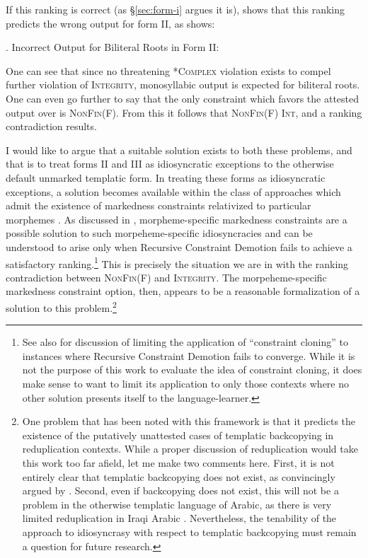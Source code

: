 \documentclass[12pt,twoside,letterpaper]{article}
\begin{document}
If this ranking is correct (as \S{\ref{sec:form-i}} argues it is), \Next shows that this ranking predicts the wrong output for form II, as \Next shows:

\ex. Incorrect Output for Biliteral Roots in Form II:\\\begin{OTtableau}{3}
\end{OTtableau}

One can see that since no threatening *\textsc{Complex} violation exists to compel further violation of \textsc{Integrity}, monosyllabic output is expected for biliteral roots. One can even go further to say that the only constraint which favors the attested output {\em {}} over {\em {}} is \textsc{NonFin}(F). From this it follows that \textsc{NonFin}(F) \OTdom \textsc{Int}, and a ranking contradiction results.

I would like to argue that a suitable solution exists to both these problems, and that is to treat forms II and III as idiosyncratic exceptions to the otherwise default unmarked templatic form. In treating these forms as idiosyncratic exceptions, a solution becomes available within the class of approaches which admit the existence of markedness constraints relativized to particular morphemes \citep{pater00,flack07,paterToAppear}. As discussed in \cite{paterToAppear}, morpheme-specific markedness constraints are a possible solution to such morpeheme-specific idiosyncracies and can be understood to arise only when Recursive Constraint Demotion \citep{tesar00} fails to achieve a satisfactory ranking.\footnote{See also \cite{becker09} for discussion of limiting the application of ``constraint cloning'' to instances where Recursive Constraint Demotion fails to converge. While it is not the purpose of this work to evaluate the idea of constraint cloning, it does make sense to want to limit its application to only those contexts where no other solution presents itself to the language-learner.} This is precisely the situation we are in with the ranking contradiction between \textsc{NonFin}(F) and \textsc{Integrity}. The morpeheme-specific markedness constraint option, then, appears to be a reasonable formalization of a solution to this problem.\footnote{One problem that has been noted with this framework is that it predicts the existence of the putatively unattested cases of templatic backcopying in reduplication contexts. While a proper discussion of reduplication would take this work too far afield, let me make two comments here. First, it is not entirely clear that templatic backcopying does not exist, as convincingly argued by \cite{gouskova07}. Second, even if backcopying does not exist, this will not be a problem in the otherwise templatic language of Arabic, as there is very limited reduplication in Iraqi Arabic \citep{erwin04}. Nevertheless, the tenability of the \cite{paterToAppear} approach to idiosyncrasy with respect to templatic backcopying must remain a question for future research.}
\end{document}
